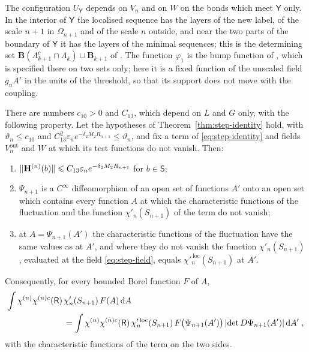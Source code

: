 \documentclass[11pt]{preprint}
\newcommand{\dd}{\mathrm{d}}
\DeclarePairedDelimiter{\abs}{\lvert}{\rvert}
\DeclarePairedDelimiter{\norm}{\lVert}{\rVert}
\numberwithin{equation}{section}
\begin{document}
The configuration $U_{\mathsf Y}$ depends on $V_n$ and on $W$ on the bonds which meet $\mathsf Y$ only. In the interior of $\mathsf Y$ the localised sequence has the layers of the new label, of the scale $n + 1$ in $\Omega_{n+1}$ and of the scale $n$ outside, and near the two parts of the boundary of $\mathsf Y$ it has the layers of the minimal sequences; this is the determining set $\mathbf B(\Lambda^c_{k+1} \cap \Lambda_k) \cup \mathbf B_{k+1}$ of \cite[p.~269]{BalabanCRE}. The function $\varphi_1$ is the bump function of \cite[p.~252]{BalabanCRE}, which is specified there on two sets only; here it is a fixed function of the unscaled field $g_nA'$ in the units of the threshold, so that its support does not move with the coupling.

\begin{proposition}\label{prop:boundary-change}
There are numbers $c_{10} > 0$ and $C_{13}$, which depend on $L$ and $G$ only, with the following property. Let the hypotheses of Theorem~\ref{thm:step-identity} hold, with $\vartheta_n \leqslant c_{10}$ and $C^2_{13}\varepsilon_ne^{-\delta_2M_2R_{n+1}} \leqslant \vartheta_n$, and fix a term of \eqref{eq:step-identity} and fields $V^{\mathrm{out}}_n$ and $W$ at which its test functions do not vanish. Then:
\begin{enumerate}[label=(\roman*)]
\item $\norm{\mathbf H^{(n)}(b)} \leqslant C_{13}\varepsilon_ne^{-\delta_2M_2R_{n+1}}$ for $b \in \mathsf S$;
\item $\Psi_{n+1}$ is a $C^\infty$ diffeomorphism of an open set of functions $A'$ onto an open set which contains every function $A$ at which the characteristic functions of the fluctuation and the function $\chi'_n(S_{n+1})$ of the term do not vanish;
\item at $A = \Psi_{n+1}(A')$ the characteristic functions of the fluctuation have the same values as at $A'$, and where they do not vanish the function $\chi'_n(S_{n+1})$, evaluated at the field \eqref{eq:step-field}, equals $\chi'^{\,\mathrm{loc}}_n(S_{n+1})$ at $A'$.
\end{enumerate}
Consequently, for every bounded Borel function $F$ of $A$,
\begin{equation}\label{eq:boundary-change-identity}
\begin{aligned}
    \int\chi^{(n)}\chi^{(n)c}(\mathsf R)\,&\chi'_n(S_{n+1})\,F(A)\,\dd A\\
    &= \int\chi^{(n)}\chi^{(n)c}(\mathsf R)\,\chi'^{\,\mathrm{loc}}_n(S_{n+1})\,F\bigl(\Psi_{n+1}(A')\bigr)\,\abs{\det D\Psi_{n+1}(A')}\,\dd A'\;,
\end{aligned}
\end{equation}
with the characteristic functions of the term on the two sides.
\end{proposition}
\end{document}
